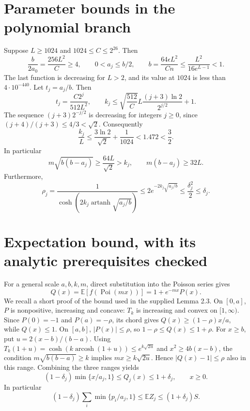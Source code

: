 \documentclass[11pt]{article}
\newcommand{\E}{\mathbb E}
\newcommand{\Poi}{\operatorname{Poi}}
\begin{document}
\section{Parameter bounds in the polynomial branch}
Suppose $L\ge1024$ and $1024\le C\le2^{26}$. Then
\[
 \frac b{2a_0}=\frac{256L^2}{C}\ge4,
 \qquad 0<a_j\le b/2,\qquad
 b=\frac{64\epsilon L^2}{Cn}\le\frac{L^2}{16e^{L-1}}<1.
\]
The last function is decreasing for $L>2$, and its value at $1024$ is
less than $4\cdot10^{-440}$. Let $t_j=a_j/b$. Then
\[
 t_j=\frac{C2^j}{512L^2},\qquad
 k_j\le \sqrt{\frac{512}{C}}L\frac{(j+3)\ln2}{2^{j/2}}+1.
\]
The sequence $(j+3)2^{-j/2}$ is decreasing for integers $j\ge0$, since
$(j+4)/(j+3)\le4/3<\sqrt2$. Consequently
\begin{equation}
 \frac{k_j}{L}\le\frac{3\ln2}{\sqrt2}+\frac1{1024}
 <1.472<\frac32.\label{eq:degree}
\end{equation}
In particular
\[
 m\sqrt{b(b-a_j)}\ge\frac{64L}{\sqrt2}>k_j,
 \qquad m(b-a_j)\ge32L.
\]
Furthermore,
\[
 \rho_j=\frac1{\cosh(2k_j\operatorname{artanh}\sqrt{a_j/b})}
 \le2e^{-2k_j\sqrt{a_j/b}}
 \le\frac{\delta_j^2}{2}\le\delta_j.
\]

\section{Expectation bound, with its analytic prerequisites checked}
For a general scale $a,b,k,m$, direct substitution into the Poisson series
gives
\[
 Q(x)=\E[f(\Poi(mx))]=1+e^{-mx}P(x).
\]
We recall a short proof of the bound used in the supplied Lemma 2.3.
On $[0,a]$, $P$ is nonpositive, increasing and concave: $T_k$ is increasing
and convex on $[1,\infty)$. Since $P(0)=-1$ and $P(a)=-\rho$, its chord gives
$Q(x)\ge(1-\rho)x/a$, while $Q(x)\le1$. On $[a,b]$, $|P(x)|\le\rho$, so
$1-\rho\le Q(x)\le1+\rho$. For $x\ge b$, put $u=2(x-b)/(b-a)$.
Using $T_k(1+u)=\cosh(k\operatorname{arcosh}(1+u))\le e^{k\sqrt{2u}}$
and $x^2\ge4b(x-b)$, the condition $m\sqrt{b(b-a)}\ge k$ implies
$mx\ge k\sqrt{2u}$. Hence $|Q(x)-1|\le\rho$ also in this range.
Combining the three ranges yields
\begin{equation}
 (1-\delta_j)\min\{x/a_j,1\}\le Q_j(x)\le1+\delta_j,
 \qquad x\ge0.\label{eq:expectation}
\end{equation}
In particular
\[
 (1-\delta_j)\sum_i\min\{p_i/a_j,1\}\le\E Z_j\le(1+\delta_j)S.
\]
\end{document}
